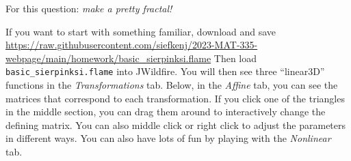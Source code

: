\documentclass[letter]{article}
\begin{document}
\begin{enumerate}
		For this question: \emph{make a pretty fractal!}

		If you want to start with something familiar, download and save \url{https://raw.githubusercontent.com/siefkenj/2023-MAT-335-webpage/main/homework/basic_sierpinksi.flame}
		Then load \verb|basic_sierpinksi.flame| into JWildfire. You will then see three ``linear3D'' functions in the \emph{Transformations} tab.
		Below, in the \emph{Affine} tab, you can see the matrices that correspond to each transformation. If you click one of the triangles
		in the middle section, you can drag them around to interactively change the defining matrix. You can also middle click or right click to
		adjust the parameters in different ways. You can also have lots of fun by playing with the \emph{Nonlinear} tab.





	\end{enumerate}
\end{document}
